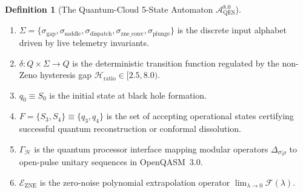 \documentclass[11pt,a4paper,reqno]{article}
\theoremstyle{plain}
\theoremstyle{definition}
\newtheorem{definition}[theorem]{Definition}
\theoremstyle{remark}
\numberwithin{equation}{section}
\begin{document}
\begin{definition}[The Quantum-Cloud 5-State Automaton $\mathcal{A}_{\mathrm{QES}}^{8.0}$]
\begin{enumerate}
\begin{itemize}
    \end{itemize}
    \item $\Sigma = \{\sigma_{\mathrm{gap}}, \sigma_{\mathrm{saddle}}, \sigma_{\mathrm{dispatch}}, \sigma_{\mathrm{zne\_conv}}, \sigma_{\mathrm{plunge}}\}$ is the discrete input alphabet driven by live telemetry invariants.
    \item $\delta: Q \times \Sigma \to Q$ is the deterministic transition function regulated by the non-Zeno hysteresis gap $\mathcal{H}_{\mathrm{ratio}} \in [2.5, 8.0)$.
    \item $q_0 \equiv S_0$ is the initial state at black hole formation.
    \item $F = \{S_3, S_4\} \equiv \{q_3, q_4\}$ is the set of accepting operational states certifying successful quantum reconstruction or conformal dissolution.
    \item $\Gamma_{\mathcal{H}}$ is the quantum processor interface mapping modular operators $\Delta_{\sigma|\rho}$ to open-pulse unitary sequences in OpenQASM~3.0.
    \item $\mathcal{E}_{\mathrm{ZNE}}$ is the zero-noise polynomial extrapolation operator $\lim_{\lambda \to 0} \mathcal{F}(\lambda)$.
\end{enumerate}
\end{definition}
\end{document}
